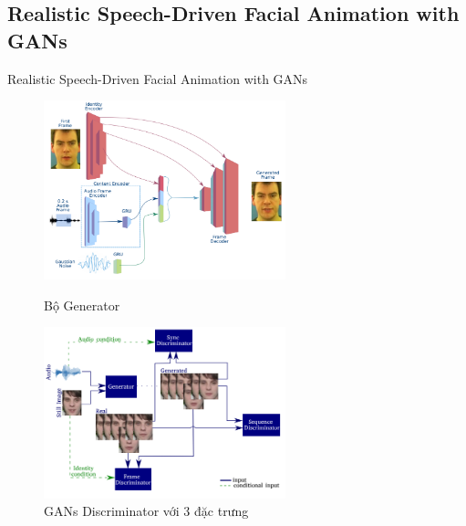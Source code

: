 \subsection{Realistic Speech-Driven Facial Animation with GANs\cite{vougioukas2020}}
\begin{frame}{Realistic Speech-Driven Facial Animation with GANs}
    \begin{figure}[H]
        \centering
        \begin{minipage}{0.48\textwidth}
            \includegraphics[width=7cm]{./images/vou2020_generator.png}
            \caption{Bộ Generator}
            \label{fig:vou2020_generator}
        \end{minipage}\hfill
        \begin{minipage}{0.48\textwidth}
            \includegraphics[width=7cm]{./images/vou2020_model.png}
            \caption{GANs Discriminator với 3 đặc trưng}
            \label{fig:vou2020_model}
        \end{minipage}
    \end{figure}
\end{frame}

